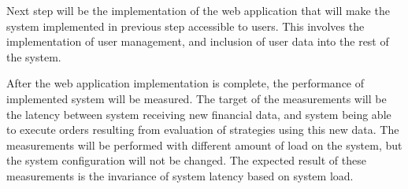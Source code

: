 Next step  will be the implementation
of the web application that will make the system implemented in previous step accessible to users. This involves the implementation of user management,
and inclusion of user data into the rest of the system.

After the web application implementation is complete, the performance of implemented system will be measured. The target of the measurements
will be the latency between system receiving new financial data, and system being able to  execute orders resulting from
evaluation of strategies using this new data. The measurements will be performed with different amount of
load on the system, but the system configuration will not be changed. The expected result of these measurements is the
invariance of system latency based on system load.



